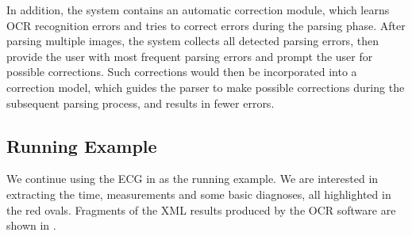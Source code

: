 In addition, the system contains an automatic correction module,
which learns OCR recognition errors and tries to correct errors
during the parsing phase.
After parsing multiple images, the system collects all detected parsing errors,
then provide the user with most frequent parsing errors and
prompt the user for possible corrections.
Such corrections would then be incorporated into a correction model,
which guides the parser to make possible corrections
during the subsequent parsing process, and results in fewer errors.



\subsection{Running Example}
We continue using the ECG in  as the running example.
We are interested in extracting the time, measurements and some basic diagnoses,
all highlighted in the red ovals.
Fragments of the XML results produced by the OCR software are shown in .



